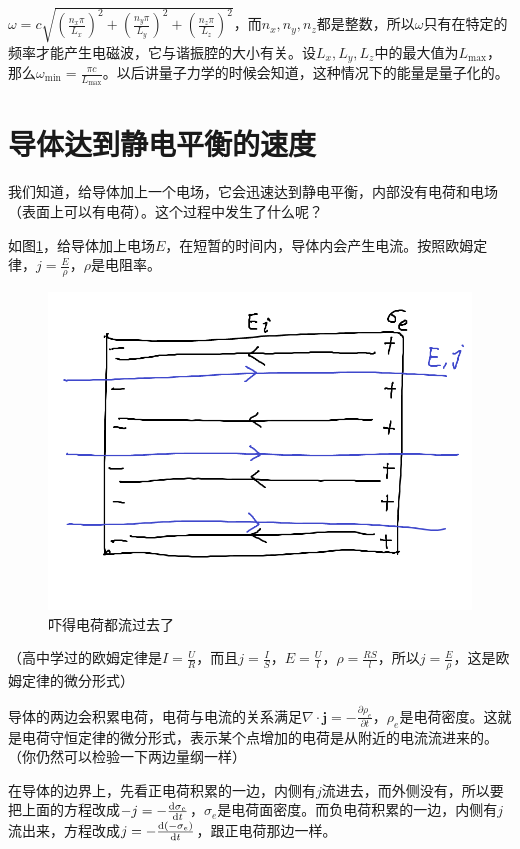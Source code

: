 $\omega=c \sqrt{(\frac{n_x \pi}{L_x})^2+(\frac{n_y \pi}{L_y})^2+(\frac{n_z \pi}{L_z})^2}$，而$n_x,n_y,n_z$都是整数，所以$\omega$只有在特定的频率才能产生电磁波，它与谐振腔的大小有关。设$L_x,L_y,L_z$中的最大值为$L_\text{max}$，那么$\omega_\text{min}=\frac{\pi c}{L_\text{max}}$。以后讲量子力学的时候会知道，这种情况下的能量是量子化的。
\section{导体达到静电平衡的速度}
我们知道，给导体加上一个电场，它会迅速达到静电平衡，内部没有电荷和电场（表面上可以有电荷）。这个过程中发生了什么呢？

如图\ref{fig-elec-equi}，给导体加上电场$E$，在短暂的时间内，导体内会产生电流。按照欧姆定律，$j=\frac{E}{\rho}$，$\rho$是电阻率。
\begin{figure}[htb]
\centering
\includegraphics[scale=0.5]{fig/elec-equi}
\caption{吓得电荷都流过去了}
\label{fig-elec-equi}
\end{figure}

（高中学过的欧姆定律是$I=\frac{U}{R}$，而且$j=\frac{I}{S}$，$E=\frac{U}{l}$，$\rho=\frac{R S}{l}$，所以$j=\frac{E}{\rho}$，这是欧姆定律的微分形式）

导体的两边会积累电荷，电荷与电流的关系满足$\nabla \cdot \mathbf{j}=-\frac{\partial \rho_e}{\partial t}$，$\rho_e$是电荷密度。这就是电荷守恒定律的微分形式，表示某个点增加的电荷是从附近的电流流进来的。（你仍然可以检验一下两边量纲一样）

在导体的边界上，先看正电荷积累的一边，内侧有$j$流进去，而外侧没有，所以要把上面的方程改成$-j=-\frac{\mathop{}\!\mathrm{d} \sigma_e}{\mathop{}\!\mathrm{d} t}$，$\sigma_e$是电荷面密度。而负电荷积累的一边，内侧有$j$流出来，方程改成$j=-\frac{\mathop{}\!\mathrm{d} (-\sigma_e)}{\mathop{}\!\mathrm{d} t}$，跟正电荷那边一样。

